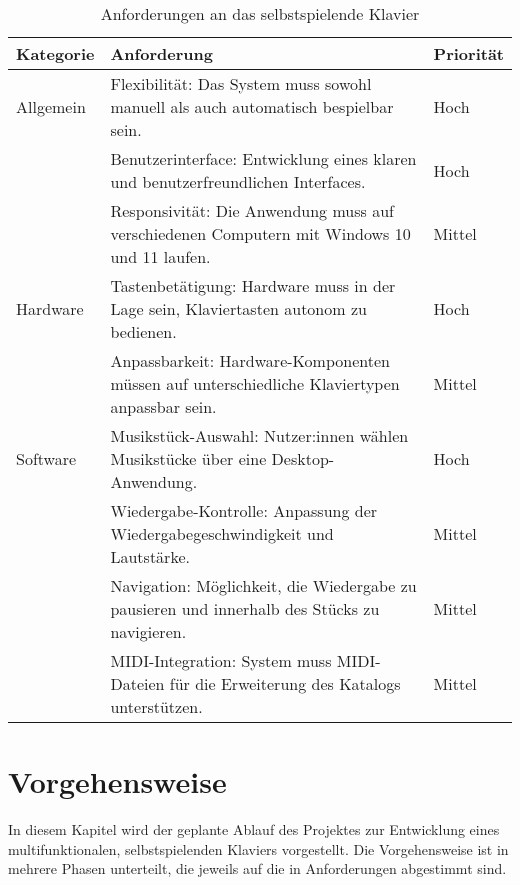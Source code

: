 \begin{table}[ht]
    \centering
    \begin{tabular}{ | m{2cm} | m{10cm}| m{2cm} | }
        \hline
        \textbf{Kategorie} & \textbf{Anforderung} & \textbf{Priorität} \\
        \hline
        Allgemein & Flexibilität: Das System muss sowohl manuell als auch automatisch bespielbar sein. & Hoch \\
        \cline{2-3}
        & Benutzerinterface: Entwicklung eines klaren und benutzerfreundlichen Interfaces. & Hoch \\
        \cline{2-3}
        & Responsivität: Die Anwendung muss auf verschiedenen Computern mit Windows 10 und 11 laufen. & Mittel \\
        \cline{2-3}
        \hline
        Hardware & Tastenbetätigung: Hardware muss in der Lage sein, Klaviertasten autonom zu bedienen. & Hoch \\
        \cline{2-3}
        & Anpassbarkeit: Hardware-Komponenten müssen auf unterschiedliche Klaviertypen anpassbar sein. & Mittel \\
        \hline
        Software & Musikstück-Auswahl: Nutzer:innen wählen Musikstücke über eine Desktop-Anwendung. & Hoch \\
        \cline{2-3}
        & Wiedergabe-Kontrolle: Anpassung der Wiedergabegeschwindigkeit und Lautstärke. & Mittel \\
        \cline{2-3}
        & Navigation: Möglichkeit, die Wiedergabe zu pausieren und innerhalb des Stücks zu navigieren. & Mittel \\
        \cline{2-3}
        & MIDI-Integration: System muss MIDI-Dateien für die Erweiterung des Katalogs unterstützen. & Mittel \\
        \hline
    \end{tabular}
    \caption{Anforderungen an das selbstspielende Klavier}
    \label{table:anforderungen}
\end{table}


\section{Vorgehensweise} \label{sec:zielstellung-vorgehen}

In diesem Kapitel wird der geplante Ablauf des Projektes zur Entwicklung eines multifunktionalen, selbstspielenden Klaviers vorgestellt.
Die Vorgehensweise ist in mehrere Phasen unterteilt, die jeweils auf die in Anforderungen abgestimmt sind.

